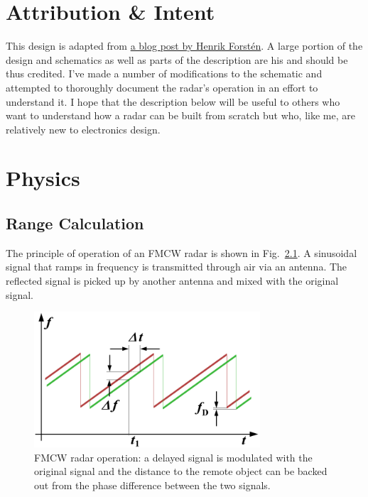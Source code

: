 \documentclass{default}
\begin{document}
\tableofcontents
\hypersetup{linkcolor=red}

\chapter{Attribution \& Intent}
\label{cha:attribution}

This design is adapted from
\href{http://hforsten.com/third-version-of-homemade-6-ghz-fmcw-radar.html}{a blog post by Henrik
  Forst\'en}. A large portion of the design and schematics as well as parts of the description are
his and should be thus credited. I've made a number of modifications to the schematic and attempted
to thoroughly document the radar's operation in an effort to understand it. I hope that the
description below will be useful to others who want to understand how a radar can be built from
scratch but who, like me, are relatively new to electronics design.

\chapter{Physics}
\label{cha:overview}

\section{Range Calculation}
\label{sec:range}

The principle of operation of an FMCW radar is shown in Fig.~\ref{fig:fmcw-principle}. A sinusoidal
signal that ramps in frequency is transmitted through air via an antenna. The reflected signal is
picked up by another antenna and mixed with the original signal.

\begin{figure}[h]
        \centering
        \includegraphics[width=0.75\textwidth]{data/fmcw-principle}
        \caption{FMCW radar operation: a delayed signal is modulated with the original signal and
          the distance to the remote object can be backed out from the phase difference between the
          two signals.}
        \label{fig:fmcw-principle}
\end{figure}
\end{document}
